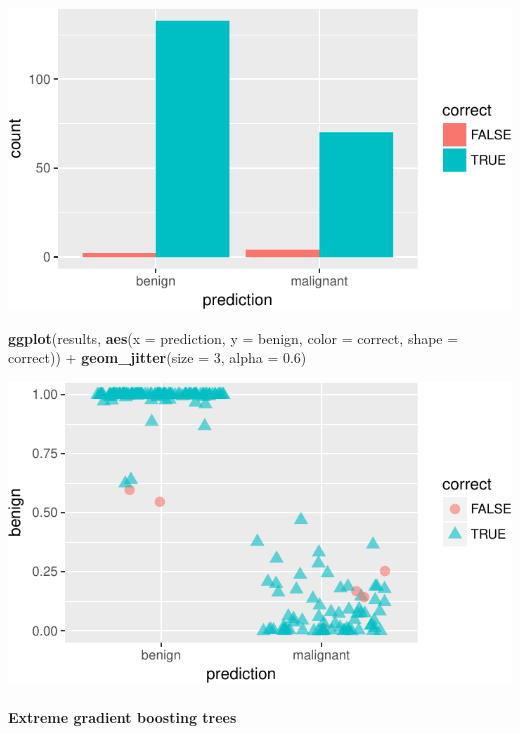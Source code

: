 \documentclass[]{article}
\newenvironment{Shaded}{\begin{snugshade}}{\end{snugshade}}
\newcommand{\KeywordTok}[1]{\textcolor[rgb]{0.13,0.29,0.53}{\textbf{{#1}}}}
\newcommand{\DataTypeTok}[1]{\textcolor[rgb]{0.13,0.29,0.53}{{#1}}}
\newcommand{\DecValTok}[1]{\textcolor[rgb]{0.00,0.00,0.81}{{#1}}}
\newcommand{\FloatTok}[1]{\textcolor[rgb]{0.00,0.00,0.81}{{#1}}}
\newcommand{\StringTok}[1]{\textcolor[rgb]{0.31,0.60,0.02}{{#1}}}
\newcommand{\NormalTok}[1]{{#1}}
\let\oldparagraph\paragraph
\renewcommand{\paragraph}[1]{\oldparagraph{#1}\mbox{}}
\begin{document}
\includegraphics{webinar_code_files/figure-latex/results_bar_rf-1.pdf}

\begin{Shaded}
\begin{Highlighting}[]
\KeywordTok{ggplot}\NormalTok{(results, }\KeywordTok{aes}\NormalTok{(}\DataTypeTok{x =} \NormalTok{prediction, }\DataTypeTok{y =} \NormalTok{benign, }\DataTypeTok{color =} \NormalTok{correct, }\DataTypeTok{shape =} \NormalTok{correct)) +}
\StringTok{  }\KeywordTok{geom_jitter}\NormalTok{(}\DataTypeTok{size =} \DecValTok{3}\NormalTok{, }\DataTypeTok{alpha =} \FloatTok{0.6}\NormalTok{)}
\end{Highlighting}
\end{Shaded}

\includegraphics{webinar_code_files/figure-latex/results_jitter_rf-1.pdf}

\paragraph{Extreme gradient boosting
trees}\label{extreme-gradient-boosting-trees}
\end{document}
